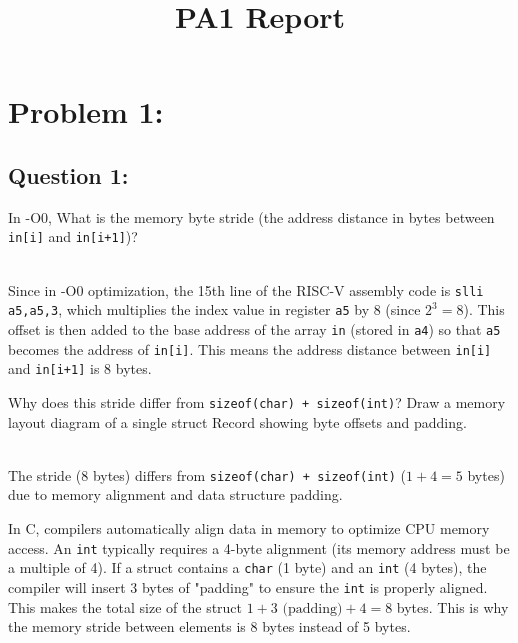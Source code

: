 \documentclass[12pt, a4paper]{article}
\title{PA1 Report}
\author{}
\date{}
\begin{document}
\maketitle
\vspace{-2.0cm} %

\section*{Problem 1:}

\subsection*{Question 1:}

In -O0, What is the memory byte stride (the address distance in bytes between \texttt{in[i]} and \texttt{in[i+1]})?

\vspace{0.3cm}
\noindent{}\\
Since in -O0 optimization, the 15th line of the RISC-V assembly code is \texttt{slli a5,a5,3}, which multiplies the index value in register \texttt{a5} by 8 (since $2^3 = 8$). This offset is then added to the base address of the array \texttt{in} (stored in \texttt{a4}) so that \texttt{a5} becomes the address of \texttt{in[i]}. This means the address distance between \texttt{in[i]} and \texttt{in[i+1]} is 8 bytes.

\noindent\hrulefill

\vspace{0.3cm}
\noindent
Why does this stride differ from \texttt{sizeof(char) + sizeof(int)}? Draw a memory layout diagram of a single struct Record showing byte offsets
and padding. 

\vspace{0.3cm}
\noindent{}\\
The stride (8 bytes) differs from \texttt{sizeof(char) + sizeof(int)} ($1 + 4 = 5$ bytes) due to memory alignment and data structure padding. 

In C, compilers automatically align data in memory to optimize CPU memory access. An \texttt{int} typically requires a 4-byte alignment (its memory address must be a multiple of 4). If a struct contains a \texttt{char} (1 byte) and an \texttt{int} (4 bytes), the compiler will insert 3 bytes of "padding" to ensure the \texttt{int} is properly aligned. This makes the total size of the struct $1 + 3 \text{ (padding)} + 4 = 8$ bytes. This is why the memory stride between elements is 8 bytes instead of 5 bytes.
\end{document}
